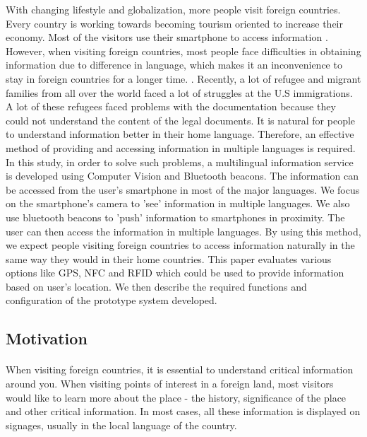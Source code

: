 \documentclass[12pt]{article}
\begin{document}
With changing lifestyle and globalization, more people visit foreign countries. Every country is working towards becoming tourism oriented to increase their economy. Most of the visitors use their smartphone to access information \cite{audioBeacon}. However, when visiting foreign countries, most people face difficulties in obtaining information due to difference in language, which makes it an inconvenience to stay in foreign countries for a longer time. \cite{one}. Recently, a lot of refugee and migrant families from all over the world faced a lot of struggles at the U.S immigrations. A lot of these refugees faced problems with the documentation because they could not understand the content of the legal documents. It is natural for people to understand information better in their home language. Therefore, an effective method of providing and accessing information in multiple languages is required. \\

In this study, in order to solve such problems, a multilingual information service is developed using Computer Vision and Bluetooth beacons. The information can be accessed from the user's smartphone in most of the major languages. We focus on the smartphone's camera to 'see' information in multiple languages. We also use bluetooth beacons to 'push' information to smartphones in proximity. The user can then access the information in multiple languages. By using this method, we expect people visiting foreign countries to access information naturally in the same way they would in their home countries. This paper evaluates various options like GPS, NFC and RFID which could be used to provide information based on user's location. We then describe the required functions and configuration of the prototype system developed. \\

\subsection{Motivation}
\label{motive}
\paragraph{}When visiting foreign countries, it is essential to understand critical information around you. When visiting points of interest in a foreign land, most visitors would like to learn more about the place - the history, significance of the place and other critical information. In most cases, all these information is displayed on signages, usually in the local language of the country. 
\end{document}
